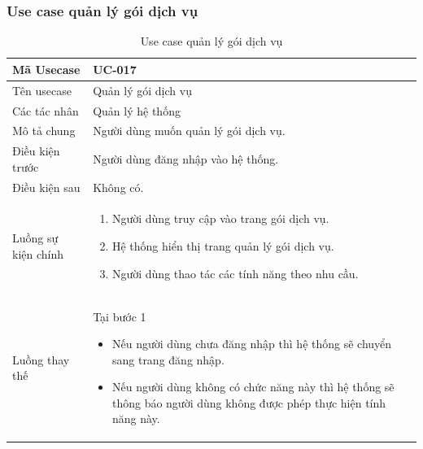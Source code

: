 \documentclass[12pt,a4paper]{article}
\begin{document}
    \subsubsection*{Use case quản lý gói dịch vụ}
    \begin{table}[H]
        \centering
        \begin{tabular}{|p{3.5cm}|p{11.5cm}|c|}
            \hline
            Mã Usecase      & UC-017                               \\
            \hline
            Tên usecase     & Quản lý gói dịch vụ                  \\
            \hline
            Các tác nhân    & Quản lý hệ thống                     \\
            \hline
            Mô tả chung     & Người dùng muốn quản lý gói dịch vụ. \\
            \hline

            Điều kiện trước & Người dùng đăng nhập vào hệ thống.   \\
            \hline

            Điều kiện sau   & Không có.                            \\
            \hline

            Luồng sự kiện chính & \vspace{-.8cm}\begin{enumerate}
                                                    \item Người dùng truy cập vào trang gói dịch vụ.
                                                    \item Hệ thống hiển thị trang quản lý gói dịch vụ.
                                                    \item Người dùng thao tác các tính năng theo nhu cầu.
            \end{enumerate}
            \\
            \hline
            Luồng thay thế & Tại bước 1\newline
            \vspace{-.8cm}\begin{itemize}
                              \item Nếu người dùng chưa đăng nhập thì hệ thống sẽ chuyển sang trang đăng nhập.
                              \item Nếu người dùng không có chức năng này thì hệ thống sẽ thông báo người dùng không được phép thực hiện tính năng này.
            \end{itemize}

            \\ \hline
        \end{tabular}
        \caption{Use case quản lý gói dịch vụ}

    \end{table}
\end{document}

